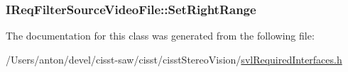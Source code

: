 \subsubsection[{Set\+Right\+Range}]{ I\+Req\+Filter\+Source\+Video\+File\+::\+Set\+Right\+Range}\label{class_i_req_filter_source_video_file_a58296d3697fcada0a84c8c67bebdcf11}


The documentation for this class was generated from the following file\+:\begin{DoxyCompactItemize}
\item 
/\+Users/anton/devel/cisst-\/saw/cisst/cisst\+Stereo\+Vision/\hyperlink{svl_required_interfaces_8h}{svl\+Required\+Interfaces.\+h}\end{DoxyCompactItemize}
